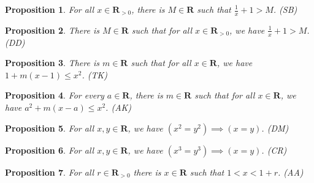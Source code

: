 \documentclass[12pt,fleqn,answers]{article}
\newcommand{\reals}{\mathbf{R}}
\newtheorem{prop}{Proposition}
\begin{document}
   


       
    \begin{prop} For all $x \in \reals_{>0}$, there is $M \in \reals$ such
     that $\frac{1}{x} +1 > M$. \hfill (SB)
    \end{prop}

    \begin{prop}
      There is $M \in \reals$ such that for all $x \in \reals_{>0}$,
     we have $\frac{1}{x} + 1 > M$. \hfill (DD) 
    \end{prop}

     \begin{prop}
      There is $m \in \reals$ such that for all $x \in \reals$, we 
     have $1 + m(x-1) \leq x^2$. \hfill (TK)
     \end{prop}

     \begin{prop} For every $a \in \reals$, there is $m \in \reals$ such 
     that for all $x \in \reals$, we have $a^2 + m(x-a) \leq x^2$. \hfill (AK)
     \end{prop}

     \begin{prop} For all $x,y \in \reals$, we have $(x^2 = y^2) \implies (x=y)$. 
     \hfill (DM)
     \end{prop} 

    \begin{prop} For all $x,y \in \reals$, we have $(x^3 = y^3) \implies (x=y)$. 
    \hfill (CR) 
    \end{prop}

    \begin{prop} For all $r \in \reals_{>0}$ there is $x \in \reals$
      such that $1 < x < 1+r$. \hfill (AA)
    \end{prop} 
\end{document}
